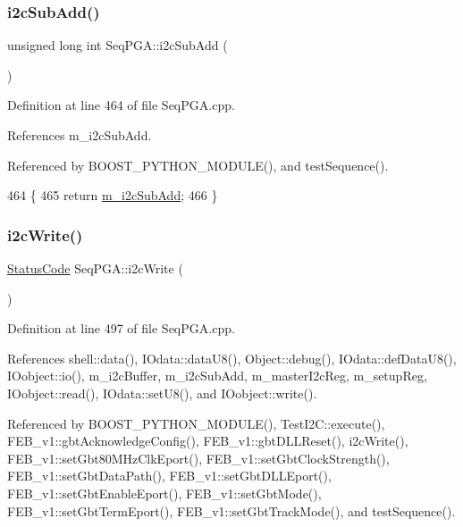 \subsubsection{\texorpdfstring{i2c\+Sub\+Add()}{i2cSubAdd()}}
{\footnotesize\ttfamily unsigned long int Seq\+P\+G\+A\+::i2c\+Sub\+Add (\begin{DoxyParamCaption}{ }\end{DoxyParamCaption})}



Definition at line 464 of file Seq\+P\+G\+A.\+cpp.



References m\+\_\+i2c\+Sub\+Add.



Referenced by B\+O\+O\+S\+T\+\_\+\+P\+Y\+T\+H\+O\+N\+\_\+\+M\+O\+D\+U\+L\+E(), and test\+Sequence().


\begin{DoxyCode}
464                                    \{
465   \textcolor{keywordflow}{return} \hyperlink{classSeqPGA_a82bda98edb9681aff47733e83ac8bc4f}{m\_i2cSubAdd}; 
466 \}
\end{DoxyCode}
\mbox{\label{classSeqPGA_a429076ca3a4ece94182bd95c623bb9d0}} 
\subsubsection{\texorpdfstring{i2c\+Write()}{i2cWrite()}\hspace{0.1cm}{\footnotesize\ttfamily [1/2]}}
{\footnotesize\ttfamily \hyperlink{classStatusCode}{Status\+Code} Seq\+P\+G\+A\+::i2c\+Write (\begin{DoxyParamCaption}{ }\end{DoxyParamCaption})}



Definition at line 497 of file Seq\+P\+G\+A.\+cpp.



References shell\+::data(), I\+Odata\+::data\+U8(), Object\+::debug(), I\+Odata\+::def\+Data\+U8(), I\+Oobject\+::io(), m\+\_\+i2c\+Buffer, m\+\_\+i2c\+Sub\+Add, m\+\_\+master\+I2c\+Reg, m\+\_\+setup\+Reg, I\+Oobject\+::read(), I\+Odata\+::set\+U8(), and I\+Oobject\+::write().



Referenced by B\+O\+O\+S\+T\+\_\+\+P\+Y\+T\+H\+O\+N\+\_\+\+M\+O\+D\+U\+L\+E(), Test\+I2\+C\+::execute(), F\+E\+B\+\_\+v1\+::gbt\+Acknowledge\+Config(), F\+E\+B\+\_\+v1\+::gbt\+D\+L\+L\+Reset(), i2c\+Write(), F\+E\+B\+\_\+v1\+::set\+Gbt80\+M\+Hz\+Clk\+Eport(), F\+E\+B\+\_\+v1\+::set\+Gbt\+Clock\+Strength(), F\+E\+B\+\_\+v1\+::set\+Gbt\+Data\+Path(), F\+E\+B\+\_\+v1\+::set\+Gbt\+D\+L\+L\+Eport(), F\+E\+B\+\_\+v1\+::set\+Gbt\+Enable\+Eport(), F\+E\+B\+\_\+v1\+::set\+Gbt\+Mode(), F\+E\+B\+\_\+v1\+::set\+Gbt\+Term\+Eport(), F\+E\+B\+\_\+v1\+::set\+Gbt\+Track\+Mode(), and test\+Sequence().


